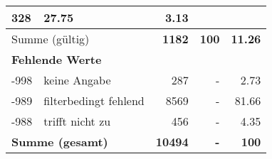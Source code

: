 \begin{longtable}{lXrrr}
       \num{328} &
       \num[round-mode=places,round-precision=2]{27,75} &
         \num[round-mode=places,round-precision=2]{3,13} \\
     \midrule
     \multicolumn{2}{l}{Summe (gültig)} &
       \textbf{\num{1182}} &
     \textbf{100} &
       \textbf{\num[round-mode=places,round-precision=2]{11,26}} \\
     \multicolumn{5}{l}{\textbf{Fehlende Werte}}\\
       -998 &
       keine Angabe &
         \num{287} &
        - &
         \num[round-mode=places,round-precision=2]{2,73} \\
       -989 &
       filterbedingt fehlend &
         \num{8569} &
        - &
         \num[round-mode=places,round-precision=2]{81,66} \\
       -988 &
       trifft nicht zu &
         \num{456} &
        - &
         \num[round-mode=places,round-precision=2]{4,35} \\
     \midrule
     \multicolumn{2}{l}{\textbf{Summe (gesamt)}} &
          \textbf{\num{10494}} &
        \textbf{-} &
        \textbf{100} \\
     \bottomrule
     \end{longtable}
     
